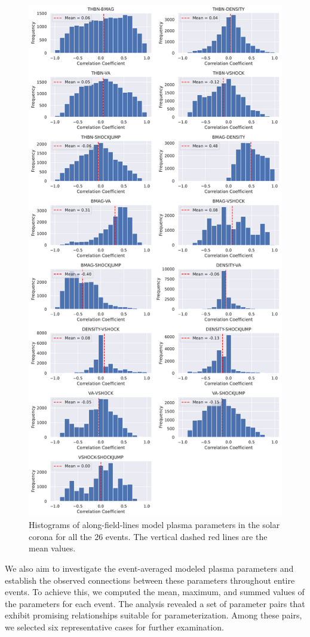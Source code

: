 \begin{figure}[!htp] %
	\centerline{\includegraphics[width=0.7\columnwidth]{chapter2/figs/wp3_d2_Fig16.pdf}}
	\caption{Histograms of along-field-lines model plasma parameters in the solar corona for all the 26 events. The vertical dashed red lines are the mean values.}
	\label{fig_hist_plasma_param_corr}
\end{figure}

We also aim to investigate the event-averaged modeled plasma parameters and establish the observed connections between these parameters throughout entire events. To achieve this, we computed the mean, maximum, and summed values of the parameters for each event. The analysis revealed a set of parameter pairs that exhibit promising relationships suitable for parameterization. Among these pairs, we selected six representative cases for further examination.

